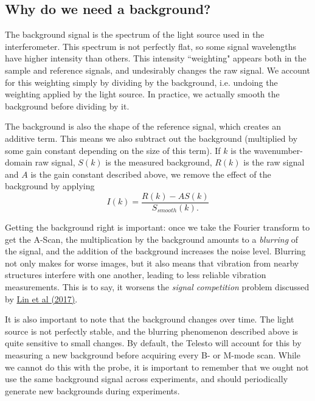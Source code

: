 \documentclass{article}
\begin{document}
\subsection{Why do we need a background?}

\par{The background signal is the spectrum of the light source used in the interferometer. This spectrum is not perfectly flat, so some signal wavelengths have higher intensity than others. This intensity ``weighting" appears both in the sample and reference signals, and undesirably changes the raw signal. We account for this weighting simply by dividing by the background, i.e. undoing the weighting applied by the light source. In practice, we actually smooth the background before dividing by it.}
\par{The background is also the shape of the reference signal, which creates an additive term. This means we also subtract out the background (multiplied by some gain constant depending on the size of this term). If $k$ is the wavenumber-domain raw signal, $S(k)$ is the measured background, $R(k)$ is the raw signal and $A$ is the gain constant described above, we remove the effect of the background by applying
	\begin{equation}
		I(k) = \frac{R(k)-A S(k)}{S_{smooth}(k).}
	\end{equation}
}
\par{Getting the background right is important: once we take the Fourier transform to get the A-Scan, the multiplication by the background amounts to a \textit{blurring} of the signal, and the addition of the background increases the noise level. Blurring not only makes for worse images, but it also means that vibration from nearby structures interfere with one another, leading to less reliable vibration measurements. This is to say, it worsens the \textit{signal competition} problem discussed by \href{https://doi.org/10.1121/1.4973867}{Lin et al (2017)}.}
\par{It is also important to note that the background changes over time. The light source is not perfectly stable, and the blurring phenomenon described above is quite sensitive to small changes. By default, the Telesto will account for this by measuring a new background before acquiring every B- or M-mode scan. While we cannot do this with the probe, it is important to remember that we ought not use the same background signal across experiments, and should periodically generate new backgrounds during experiments.}
\end{document}
